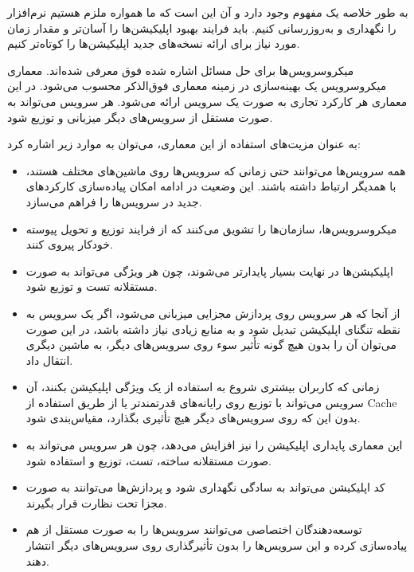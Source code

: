 به طور خلاصه یک مفهوم وجود دارد و آن این است که ما همواره ملزم هستیم نرم‌افزار را نگهداری و به‌روزرسانی کنیم. باید فرایند بهبود اپلیکیشن‌ها را آسان‌تر و مقدار زمان مورد نیاز برای ارائه نسخه‌های جدید اپلیکیشن‌ها را کوتاه‌تر کنیم.

میکروسرویس‌ها برای حل مسائل اشاره شده فوق معرفی شده‌اند. معماری میکروسرویس یک بهینه‌سازی در زمینه معماری فوق‌الذکر محسوب می‌شود. در این معماری هر کارکرد تجاری به صورت یک سرویس ارائه می‌شود. هر سرویس می‌تواند به صورت مستقل از سرویس‌های دیگر میزبانی و توزیع شود.

به عنوان مزیت‌های استفاده از این معماری، می‌توان به موارد زیر اشاره کرد:
\begin{itemize}

\item
همه سرویس‌ها می‌توانند حتی زمانی که سرویس‌ها روی ماشین‌های مختلف هستند، با همدیگر ارتباط داشته باشند. این وضعیت در ادامه امکان پیاده‌سازی کارکردهای جدید در سرویس‌ها را فراهم می‌سازد.

\item
میکروسرویس‌ها، سازمان‌ها را تشویق می‌کنند که از فرایند توزیع و تحویل پیوسته خودکار پیروی کنند.

\item
اپلیکیشن‌ها در نهایت بسیار پایدارتر می‌شوند، چون هر ویژگی می‌تواند به صورت مستقلانه تست و توزیع شود.

\item
از آنجا که هر سرویس روی پردازش مجزایی میزبانی می‌شود، اگر یک سرویس به نقطه تنگنای اپلیکیشن تبدیل شود و به منابع زیادی نیاز داشته باشد، در این صورت می‌توان آن را بدون هیچ گونه تأثیر سوء روی سرویس‌های دیگر، به ماشین دیگری انتقال داد.

\item
زمانی که کاربران بیشتری شروع به استفاده از یک ویژگی اپلیکیشن بکنند، آن سرویس می‌تواند با توزیع روی رایانه‌های قدرتمندتر یا از طریق استفاده از
\gls{Cache}
بدون این که روی سرویس‌های دیگر هیچ تأثیری بگذارد، مقیاس‌بندی شود.

\item
این معماری پایداری اپلیکیشن را نیز افزایش می‌دهد، چون هر سرویس می‌تواند به صورت مستقلانه ساخته، تست، توزیع و استفاده شود.

\item
کد اپلیکیشن می‌تواند به سادگی نگهداری شود و پردازش‌ها می‌توانند به صورت مجزا تحت نظارت قرار بگیرند.

\item
توسعه‌دهندگان اختصاصی می‌توانند سرویس‌ها را به صورت مستقل از هم پیاده‌سازی کرده و این سرویس‌ها را بدون تأثیرگذاری روی سرویس‌های دیگر انتشار دهند.


\end{itemize}
